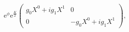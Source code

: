 \begin{equation}
\mathrm{e}^{\phi}\mathrm{e}^{\frac K 2}
\begin{pmatrix}g_0X^0+ig_1X^1&0\\
0&-g_0X^0+ig_1X^1\end{pmatrix},\label{massmatrix}\end{equation}

